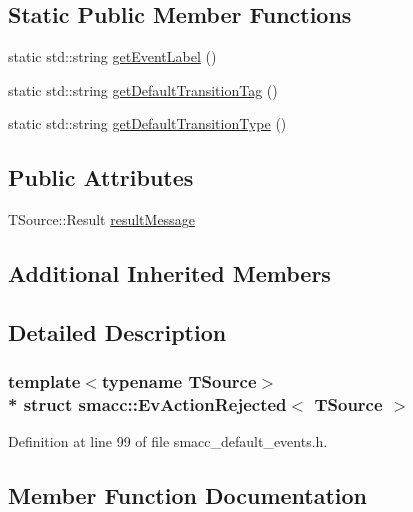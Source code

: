 \subsection*{Static Public Member Functions}
\begin{DoxyCompactItemize}
\item 
static std\+::string \hyperlink{structsmacc_1_1EvActionRejected_a9d64313d98328675fcec710ba3d9afdf}{get\+Event\+Label} ()
\item 
static std\+::string \hyperlink{structsmacc_1_1EvActionRejected_a16223e900cbc344de1ea1a68e6430583}{get\+Default\+Transition\+Tag} ()
\item 
static std\+::string \hyperlink{structsmacc_1_1EvActionRejected_aa660743d60fc026f03d287c47f4bc7fc}{get\+Default\+Transition\+Type} ()
\end{DoxyCompactItemize}
\subsection*{Public Attributes}
\begin{DoxyCompactItemize}
\item 
T\+Source\+::\+Result \hyperlink{structsmacc_1_1EvActionRejected_a338ede4228cb28879e6acce8a9dd8641}{result\+Message}
\end{DoxyCompactItemize}
\subsection*{Additional Inherited Members}


\subsection{Detailed Description}
\subsubsection*{template$<$typename T\+Source$>$\\*
struct smacc\+::\+Ev\+Action\+Rejected$<$ T\+Source $>$}



Definition at line 99 of file smacc\+\_\+default\+\_\+events.\+h.



\subsection{Member Function Documentation}
